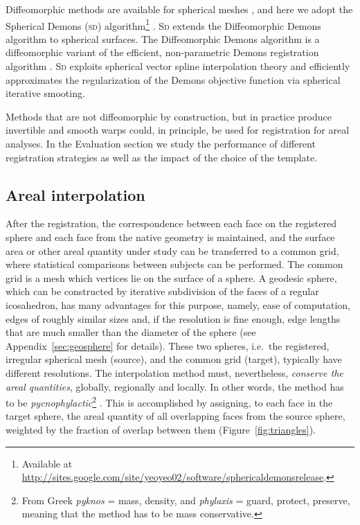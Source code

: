 Diffeomorphic methods are available for spherical meshes \citep{Glaunes2004, Yeo2010}, and here we adopt the Spherical Demons (\textsc{sd}) algorithm\footnote{Available at \href{http://sites.google.com/site/yeoyeo02/software/sphericaldemonsrelease}{http://sites.google.com/site/yeoyeo02/software/sphericaldemonsrelease}.} \citep{Yeo2010}. \textsc{Sd} extends the Diffeomorphic Demons algorithm \citep{Vercauteren2009} to spherical surfaces. The Diffeomorphic Demons algorithm is a diffeomorphic variant of the efficient, non-parametric Demons registration algorithm \citep{Thirion1998}. \textsc{Sd} exploits spherical vector spline interpolation theory and efficiently approximates the regularization of the Demons objective function via spherical iterative smooting.

Methods that are not diffeomorphic by construction, but in practice produce invertible and smooth warps could, in principle, be used for registration for areal analyses. In the Evaluation section we study the performance of different registration strategies as well as the impact of the choice of the template.

\subsection{Areal interpolation}

After the registration, the correspondence between each face on the registered sphere and each face from the native geometry is maintained, and the surface area or other areal quantity under study can be transferred to a common grid, where statistical comparisons between subjects can be performed. The common grid is a mesh which vertices lie on the surface of a sphere. A geodesic sphere, which can be constructed by iterative subdivision of the faces of a regular icosahedron, has many advantages for this purpose, namely, ease of computation, edges of roughly similar sizes and, if the resolution is fine enough, edge lengths that are much smaller than the diameter of the sphere (see Appendix~\ref{sec:geosphere} for details). These two spheres, i.e.\ the registered, irregular spherical mesh (source), and the common grid (target), typically have different resolutions. The interpolation method must, nevertheless, \emph{conserve the areal quantities}, globally, regionally and locally. In other words, the method has to be \emph{pycnophylactic}\footnote{From Greek \emph{pyknos} = mass, density, and \emph{phylaxis} = guard, protect, preserve, meaning that the method has to be mass conservative.} \citep{Tobler1979}. This is accomplished by assigning, to each face in the target sphere, the areal quantity of all overlapping faces from the source sphere, weighted by the fraction of overlap between them (Figure~\ref{fig:triangles}).

